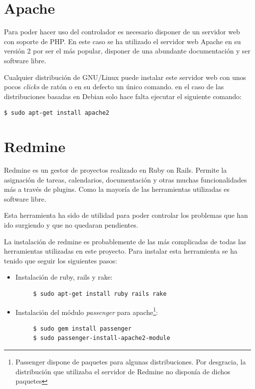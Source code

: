 \section{Apache}

Para poder hacer uso del controlador es necesario disponer de un servidor web con soporte de PHP. En este caso se ha utilizado el servidor web Apache en su versión 2 por ser el más popular, disponer de una abundante documentación y ser software libre.

Cualquier distribución de GNU/Linux puede instalar este servidor web con unos pocos \emph{clicks} de ratón o en su defecto un único comando. en el caso de las distribuciones basadas en Debian solo hace falta ejecutar el siguiente comando:

\begin{verbatim}
$ sudo apt-get install apache2
\end{verbatim}

\section{Redmine}

Redmine es un gestor de proyectos realizado en Ruby on Rails. Permite la asignación de tareas, calendarios, documentación y otras muchas funcionalidades más a través de plugins. Como la mayoría de las herramientas utilizadas es software libre.

Esta herramienta ha sido de utilidad para poder controlar los problemas que han ido surgiendo y que no quedaran pendientes.

La instalación de redmine es probablemente de las más complicadas de todas las herramientas utilizadas en este proyecto. Para instalar esta herramienta se ha tenido que seguir los siguientes pasos:

\begin{itemize}
	 \item Instalación de ruby, rails y rake:
	 \begin{verbatim}
	 $ sudo apt-get install ruby rails rake
	 \end{verbatim}
	 
	 \item Instalación del módulo \emph{passenger} para apache\footnote{Passenger dispone de paquetes para algunas distribuciones. Por desgracia, la distribución que utilizaba el servidor de Redmine no disponía de dichos paquetes}:
	 \begin{verbatim}
	 $ sudo gem install passenger
	 $ sudo passenger-install-apache2-module
	 \end{verbatim}
\end{itemize}

